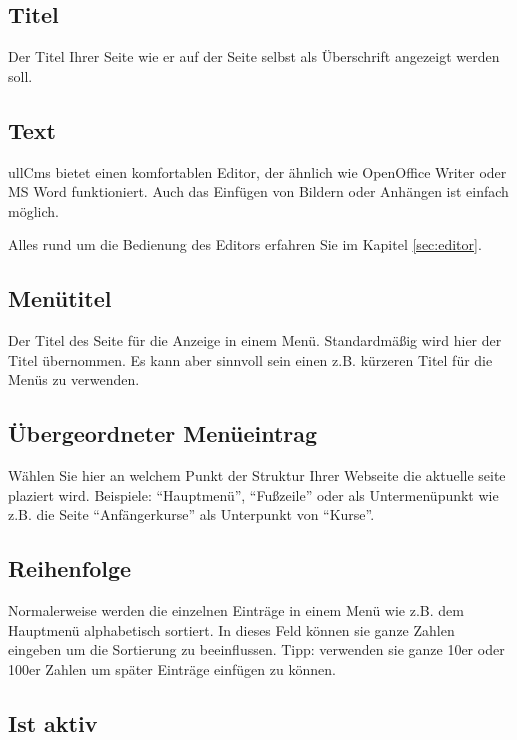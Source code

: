 \documentclass[article, a4paper, oneside, 11pt]{memoir}
\begin{document}
\subsection{Titel}

Der Titel Ihrer Seite wie er auf der Seite selbst als Überschrift angezeigt werden soll.

\subsection{Text}

ullCms bietet einen komfortablen
Editor, der ähnlich wie OpenOffice Writer oder MS Word funktioniert.
Auch das Einfügen von Bildern oder Anhängen ist einfach möglich. 

Alles rund um die Bedienung des Editors erfahren Sie im Kapitel \vref{sec:editor}.

\subsection{Menütitel}

Der Titel des Seite für die Anzeige in einem Menü. Standardmäßig wird hier der Titel übernommen. Es kann aber sinnvoll sein einen z.B. kürzeren Titel für die Menüs zu verwenden.

\subsection{Übergeordneter Menüeintrag}

Wählen Sie hier an welchem Punkt der Struktur Ihrer Webseite die aktuelle seite plaziert wird. Beispiele: "`Hauptmenü"', "`Fußzeile"' oder als Untermenüpunkt wie z.B. die Seite "`Anfängerkurse"' als Unterpunkt von "`Kurse"'.

\subsection{Reihenfolge}

Normalerweise werden die einzelnen Einträge in einem Menü wie z.B. dem Hauptmenü alphabetisch sortiert. In dieses Feld können sie ganze Zahlen eingeben um die Sortierung zu beeinflussen. Tipp: verwenden sie ganze 10er oder 100er Zahlen um später Einträge einfügen zu können. 

\subsection{Ist aktiv}
\end{document}
